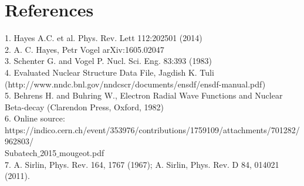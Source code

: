 \documentclass{report}
\begin{document}
\section{References}
1. Hayes A.C. et al. Phys. Rev. Lett 112:202501 (2014)\\
2. A. C. Hayes, Petr Vogel arXiv:1605.02047\\
3. Schenter G. and Vogel P. Nucl. Sci. Eng. 83:393 (1983)\\ 
4. Evaluated Nuclear Structure Data File, Jagdish K. Tuli (http://www.nndc.bnl.gov/nndcscr/documents/ensdf/ensdf-manual.pdf)\\
5. Behrens H. and Buhring W., Electron Radial Wave Functions and Nuclear Beta-decay (Clarendon
Press, Oxford, 1982) \\
6. Online source: https://indico.cern.ch/event/353976/contributions/1759109/attachments/701282/962803/ \\ Subatech$\_$2015$\_$mougeot.pdf  \\
7. A. Sirlin, Phys. Rev. 164, 1767 (1967); A. Sirlin, Phys. Rev. D 84, 014021 (2011). \\

\end{document}
